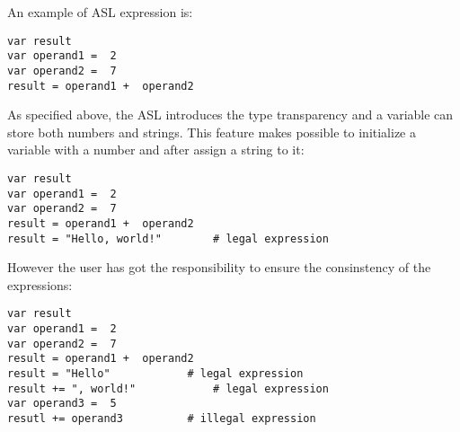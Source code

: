 An example of ASL expression is:
%
\begin{lstlisting}[language={asl}, caption={Sintax expression example}]
var result
var operand1 =  2
var operand2 =  7
result = operand1 +  operand2
\end{lstlisting}
%
As specified above, the ASL introduces the type transparency and a variable can store both numbers and strings. This feature makes possible to initialize a variable with a number and after assign a string to it:
%
\begin{lstlisting}[language={asl}, caption={Legal expressions}]
var result
var operand1 =  2
var operand2 =  7
result = operand1 +  operand2
result = "Hello, world!"		# legal expression
\end{lstlisting}
%
However the user has got the responsibility to ensure the consinstency of the expressions:
%
\begin{lstlisting}[language={asl}, caption={Illegal expressions}]
var result
var operand1 =  2
var operand2 =  7
result = operand1 +  operand2
result = "Hello"			# legal expression
result += ", world!"			# legal expression
var operand3 =  5
resutl += operand3			# illegal expression
\end{lstlisting}
